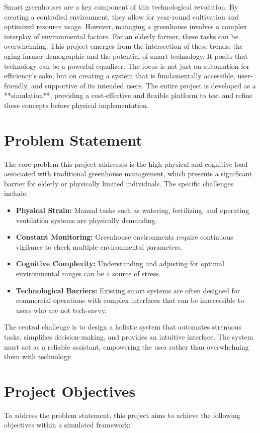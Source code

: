 \documentclass[12pt, a4paper]{report}
\begin{document}
Smart greenhouses are a key component of this technological revolution. By creating a controlled environment, they allow for year-round cultivation and optimized resource usage. However, managing a greenhouse involves a complex interplay of environmental factors. For an elderly farmer, these tasks can be overwhelming. This project emerges from the intersection of these trends: the aging farmer demographic and the potential of smart technology. It posits that technology can be a powerful equalizer. The focus is not just on automation for efficiency's sake, but on creating a system that is fundamentally accessible, user-friendly, and supportive of its intended users. The entire project is developed as a **simulation**, providing a cost-effective and flexible platform to test and refine these concepts before physical implementation.

\section{Problem Statement}
The core problem this project addresses is the high physical and cognitive load associated with traditional greenhouse management, which presents a significant barrier for elderly or physically limited individuals. The specific challenges include:

\begin{itemize}
    \item \textbf{Physical Strain:} Manual tasks such as watering, fertilizing, and operating ventilation systems are physically demanding.
    \item \textbf{Constant Monitoring:} Greenhouse environments require continuous vigilance to check multiple environmental parameters.
    \item \textbf{Cognitive Complexity:} Understanding and adjusting for optimal environmental ranges can be a source of stress.
    \item \textbf{Technological Barriers:} Existing smart systems are often designed for commercial operations with complex interfaces that can be inaccessible to users who are not tech-savvy.
\end{itemize}

The central challenge is to design a holistic system that automates strenuous tasks, simplifies decision-making, and provides an intuitive interface. The system must act as a reliable assistant, empowering the user rather than overwhelming them with technology.

\section{Project Objectives}
To address the problem statement, this project aims to achieve the following objectives within a simulated framework:
\end{document}
